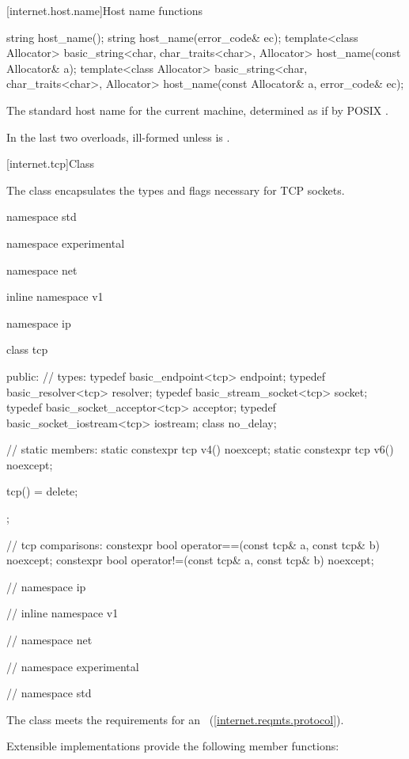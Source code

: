 [internet.host.name]{Host name functions}

%
\begin{itemdecl}
string host_name();
string host_name(error_code& ec);
template<class Allocator>
  basic_string<char, char_traits<char>, Allocator>
    host_name(const Allocator& a);
template<class Allocator>
  basic_string<char, char_traits<char>, Allocator>
    host_name(const Allocator& a, error_code& ec);
\end{itemdecl}

\begin{itemdescr}
\pnum
\returns The standard host name for the current machine, determined as if by POSIX .

\pnum
\remarks In the last two overloads, ill-formed unless  is .
\end{itemdescr}



%
[internet.tcp]{Class }

\pnum
The class  encapsulates the types and flags necessary for TCP sockets.

\begin{codeblock}
namespace std {
namespace experimental {
namespace net {
inline namespace v1 {
namespace ip {

  class tcp
  {
  public:
    // types:
    typedef basic_endpoint<tcp> endpoint;
    typedef basic_resolver<tcp> resolver;
    typedef basic_stream_socket<tcp> socket;
    typedef basic_socket_acceptor<tcp> acceptor;
    typedef basic_socket_iostream<tcp> iostream;
    class no_delay;

    // static members:
    static constexpr tcp v4() noexcept;
    static constexpr tcp v6() noexcept;

    tcp() = delete;
  };

  // tcp comparisons:
  constexpr bool operator==(const tcp& a, const tcp& b) noexcept;
  constexpr bool operator!=(const tcp& a, const tcp& b) noexcept;

} // namespace ip
} // inline namespace v1
} // namespace net
} // namespace experimental
} // namespace std
\end{codeblock}

\pnum
The  class meets the requirements for an ~(\ref{internet.reqmts.protocol}).

%
\pnum
 Extensible implementations provide the following member functions:

